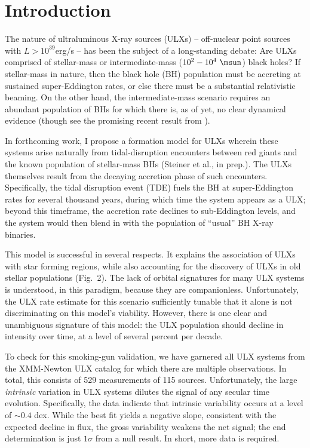 \section{Introduction}\label{section:Intro}


The nature of ultraluminous X-ray sources (ULXs) -- off-nuclear point
sources with $L>10^{39}$erg/s -- has been the subject of a
long-standing debate: Are ULXs comprised of stellar-mass or
intermediate-mass ($10^{2}-10^4~\msun$) black holes?  If stellar-mass in nature, then
the black hole (BH) population must be accreting at sustained super-Eddington
rates, or else there must be a substantial relativistic beaming.  
On the other hand, the intermediate-mass scenario requires an
abundant population of BHs for which there is, as of yet, no clear
dynamical evidence (though see the promising recent result from
\citealt{Pasham_2014}).

In forthcoming work, I propose a formation model for ULXs wherein
these systems arise naturally from tidal-disruption encounters between
red giants and the known population of stellar-mass BHs (Steiner et
al., in prep.).  The ULXs themselves result from the decaying
accretion phase of such encounters.  Specifically, the tidal
disruption event (TDE) fuels the BH at super-Eddington rates for
several thousand years, during which time the system appears as a ULX;
beyond this timeframe, the accretion rate declines to sub-Eddington
levels, and the system would then blend in with the population of
``usual'' BH X-ray binaries.

This model is successful in several respects. It explains the
association of ULXs with star forming regions, while also accounting
for the discovery of ULXs in old stellar populations (Fig.~2).  The
lack of orbital signatures for many ULX systems is understood, in this
paradigm, because they are companionless.  Unfortunately, the ULX rate
estimate for this scenario sufficiently tunable that it alone is not
discriminating on this model's viability.  However, there is one clear
and unambiguous signature of this model: the ULX population should
decline in intensity over time, at a level of several percent per
decade.

To check for this smoking-gun validation, we have garnered all ULX
systems from the \citet{Walton_2011} XMM-Newton ULX catalog for which
there are multiple observations.  In total, this consists of 529
measurements of 115 sources.  Unfortunately, the large {\em intrinsic}
variation in ULX systems dilutes the signal of any secular time
evolution.  Specifically, the data indicate that intrinsic variability
occurs at a level of $\sim0.4$ dex.  While the best fit yields a
negative slope, consistent with the expected decline in flux, the
gross variability weakens the net signal; the end determination is
just $1\sigma$ from a null result.  In short, more data is required.


